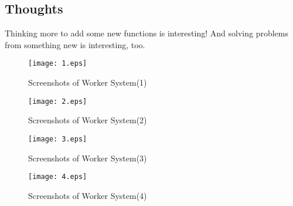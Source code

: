 \documentclass{article}
\begin{document}
\subsection{Thoughts}
Thinking more to add some new functions is interesting! And solving problems from something new is interesting, too.
\begin{figure}[h]
\centering
\texttt{[image: 1.eps]}
\caption{Screenshots of Worker System(1)}
\end{figure}
\begin{figure}[h]
\centering
\texttt{[image: 2.eps]}
\caption{Screenshots of Worker System(2)}
\end{figure}
\begin{figure}[h]
\centering
\texttt{[image: 3.eps]}
\caption{Screenshots of Worker System(3)}
\end{figure}
\begin{figure}[h]
\centering
\texttt{[image: 4.eps]}
\caption{Screenshots of Worker System(4)}
\end{figure}
\end{document}
